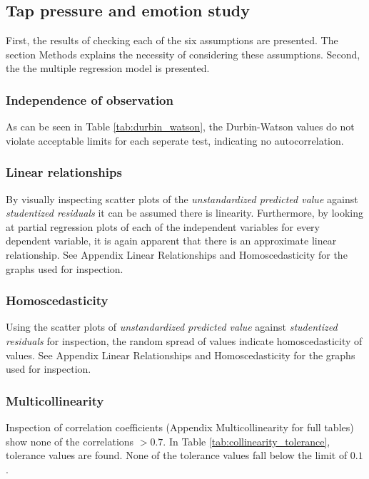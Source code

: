 \documentclass{sigchi}
\begin{document}
\subsection{Tap pressure and emotion study}
First, the results of checking each of the six assumptions are presented. The section Methods explains the necessity of considering these assumptions. Second, the the multiple regression model is presented.
\label{sub:assumptions}

\subsubsection{Independence of observation}
As can be seen in Table \ref{tab:durbin_watson}, the Durbin-Watson values do not violate acceptable limits for each seperate test, indicating no autocorrelation. \\



\subsubsection{Linear relationships}
By visually inspecting scatter plots of the \textit{unstandardized predicted value} against \textit{studentized residuals} it can be assumed there is linearity. Furthermore, by looking at partial regression plots of each of the independent variables for every dependent variable, it is again apparent that there is an approximate linear relationship. See Appendix Linear Relationships and Homoscedasticity for the graphs used for inspection.

\subsubsection{Homoscedasticity}
Using the scatter plots of \textit{unstandardized predicted value} against \textit{studentized residuals} for inspection, the random spread of values indicate homoscedasticity of values. See Appendix Linear Relationships and Homoscedasticity for the graphs used for inspection.

\subsubsection{Multicollinearity}
Inspection of correlation coefficients (Appendix Multicollinearity for full tables) show none of the correlations $> 0.7$. In Table \ref{tab:collinearity_tolerance}, tolerance values are found. None of the tolerance values fall below the limit of $0.1$.

\end{document}
